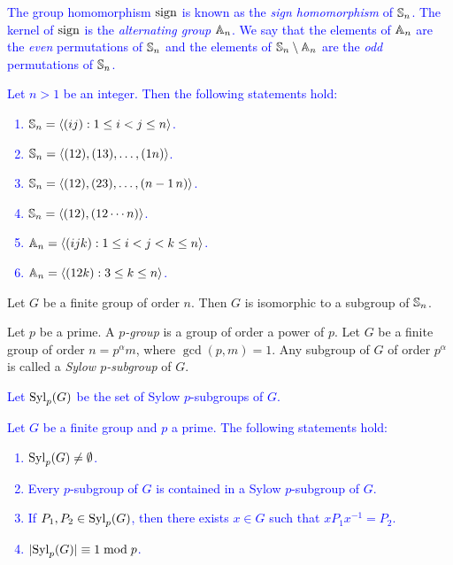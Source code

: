 \textcolor{blue}{
The group homomorphism $\operatorname{sign}$ is known as the {\em sign homomorphism} of $\mathbb{S}_n$. 
The kernel of $\operatorname{sign}$ is the {\em alternating group} $\mathbb{A}_n$.
We say that the elements of $\mathbb{A}_n$ are the {\em even} permutations of $\mathbb{S}_n$ 
and the elements of $\mathbb{S}_n\setminus\mathbb{A}_n$
are the {\em odd} permutations of $\mathbb{S}_n$.}

\begin{theorem}
\textcolor{blue}{
Let $n>1$ be an integer. Then the following statements hold:  
\begin{enumerate}
    \item $\mathbb{S}_n=\langle (ij):1\leq i<j\leq n\rangle$. 
	\item $\mathbb{S}_n=\langle (12),(13),\dots,(1n)\rangle$.
	\item $\mathbb{S}_n=\langle (12),(23),\dots,(n-1\,n)\rangle$.
	\item $\mathbb{S}_n=\langle (12),(12\cdots n)\rangle$.
	\item $\mathbb{A}_n=\langle (ijk):1\leq i<j<k\leq n\rangle$.
	\item $\mathbb{A}_n=\langle (12k):3\leq k\leq n\rangle$.
    \end{enumerate}}
\end{theorem}

\begin{theorem}
    Let $G$ be a finite group of order $n$. Then $G$ is isomorphic to a subgroup of $\mathbb{S}_n$.
\end{theorem}

Let $p$ be a prime. A {\em $p$-group} is a group of order a power of $p$. Let $G$ be a finite group of order
$n=p^\alpha m$, where $\gcd(p,m)=1$. 
Any subgroup of $G$ of order $p^\alpha$ is called a {\em Sylow $p$-subgroup} of $G$. 

\textcolor{blue}{Let 
$\mathrm{Syl}_p(G)$ be the set of Sylow $p$-subgroups of $G$. }

\begin{theorem}[Sylow]
\textcolor{blue}{
    Let $G$ be a finite group and $p$ a prime. The following statements hold:
    \begin{enumerate}
        \item $\mathrm{Syl}_p(G)\ne\emptyset$.
        \item 
        Every $p$-subgroup of $G$ is contained in a Sylow $p$-subgroup of $G$.
        \item 
        If $P_1,P_2\in\mathrm{Syl}_p(G)$, then  
        there exists $x\in G$ such that $xP_1x^{-1}=P_2$. 
        \item %
        $|\mathrm{Syl}_p(G)|\equiv 1\bmod p$.
    \end{enumerate}}
\end{theorem}

